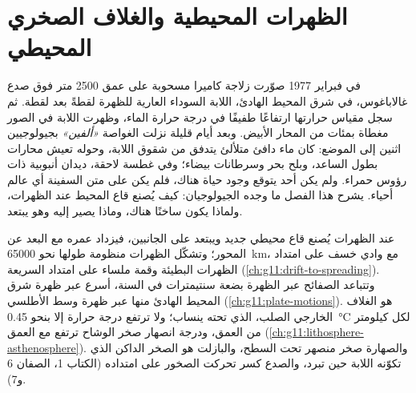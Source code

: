 \chapter{الظهرات المحيطية والغلاف الصخري المحيطي}\label{ch:g11:ocean-ridges}

في فبراير 1977 صوّرت زلاجة كاميرا مسحوبة على عمق 2500 متر فوق صدع
غالاباغوس، في شرق المحيط الهادئ، اللابة السوداء العارية للظهرة
لقطةً بعد لقطة. ثم سجل مقياس حرارتها ارتفاعًا طفيفًا في
درجة حرارة الماء، وظهرت اللابة في الصور مغطاة
بمئات من المحار الأبيض. وبعد أيام قليلة نزلت الغواصة \emph{«ألفين»}
بجيولوجيين اثنين إلى الموضع: كان ماء دافئ متلألئ يتدفق من
شقوق اللابة، وحوله تعيش محارات بطول الساعد،
وبلح بحر وسرطانات بيضاء؛ وفي غطسة لاحقة، ديدان أنبوبية ذات رؤوس حمراء. ولم يكن أحد
يتوقع وجود حياة هناك، فلم يكن على متن السفينة أي عالم أحياء. يشرح هذا الفصل
ما وجده الجيولوجيان: كيف يُصنع قاع المحيط عند الظهرات،
ولماذا يكون ساخنًا هناك، وماذا يصير إليه وهو يبتعد.

\begin{recall}
عند الظهرات يُصنع قاع محيطي جديد ويبتعد على الجانبين، فيزداد
عمره مع البعد عن المحور؛ وتشكّل الظهرات منظومة طولها نحو
\qty{65000}{km}، مع وادي خسف على امتداد الظهرات البطيئة وقمة ملساء
على امتداد السريعة (\cref{ch:g11:drift-to-spreading}). وتتباعد الصفائح عبر
الظهرة بضعة سنتيمترات في السنة، أسرع عبر ظهرة شرق المحيط الهادئ منها
عبر ظهرة وسط الأطلسي (\cref{ch:g11:plate-motions}). 
هو الغلاف الخارجي الصلب،  الذي تحته ينساب؛ ولا ترتفع درجة حرارة
 إلا بنحو \qty{0.45}{\celsius} لكل كيلومتر
من العمق، ودرجة انصهار صخر الوشاح ترتفع مع العمق
(\cref{ch:g11:lithosphere-asthenosphere}). والصهارة صخر منصهر تحت
السطح، والبازلت هو الصخر الداكن الذي تكوّنه اللابة حين تبرد، والصدع
كسر تحركت الصخور على امتداده (الكتاب 1، الصفان 6 و7).
\end{recall}

